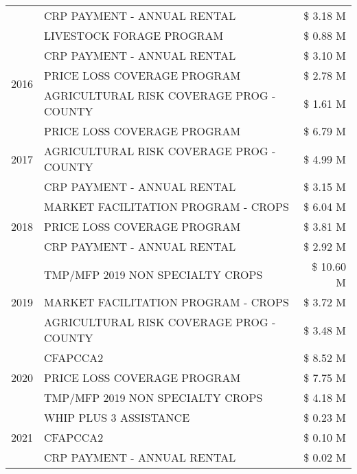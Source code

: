 \begin{tabular}{llr}
 & CRP PAYMENT - ANNUAL RENTAL & \$ 3.18 M \\
 & LIVESTOCK FORAGE PROGRAM & \$ 0.88 M \\
\cline{1-3}
\multirow[t]{3}{*}{2016} & CRP PAYMENT - ANNUAL RENTAL & \$ 3.10 M \\
 & PRICE LOSS COVERAGE PROGRAM & \$ 2.78 M \\
 & AGRICULTURAL RISK COVERAGE PROG - COUNTY & \$ 1.61 M \\
\cline{1-3}
\multirow[t]{3}{*}{2017} & PRICE LOSS COVERAGE PROGRAM & \$ 6.79 M \\
 & AGRICULTURAL RISK COVERAGE PROG - COUNTY & \$ 4.99 M \\
 & CRP PAYMENT - ANNUAL RENTAL & \$ 3.15 M \\
\cline{1-3}
\multirow[t]{3}{*}{2018} & MARKET FACILITATION PROGRAM - CROPS & \$ 6.04 M \\
 & PRICE LOSS COVERAGE PROGRAM & \$ 3.81 M \\
 & CRP PAYMENT - ANNUAL RENTAL & \$ 2.92 M \\
\cline{1-3}
\multirow[t]{3}{*}{2019} & TMP/MFP 2019 NON SPECIALTY CROPS & \$ 10.60 M \\
 & MARKET FACILITATION PROGRAM - CROPS & \$ 3.72 M \\
 & AGRICULTURAL RISK COVERAGE PROG - COUNTY & \$ 3.48 M \\
\cline{1-3}
\multirow[t]{3}{*}{2020} & CFAPCCA2 & \$ 8.52 M \\
 & PRICE LOSS COVERAGE PROGRAM & \$ 7.75 M \\
 & TMP/MFP 2019 NON SPECIALTY CROPS & \$ 4.18 M \\
\cline{1-3}
\multirow[t]{3}{*}{2021} & WHIP PLUS 3 ASSISTANCE & \$ 0.23 M \\
 & CFAPCCA2 & \$ 0.10 M \\
 & CRP PAYMENT - ANNUAL RENTAL & \$ 0.02 M \\
\cline{1-3}
\bottomrule
\end{tabular}
